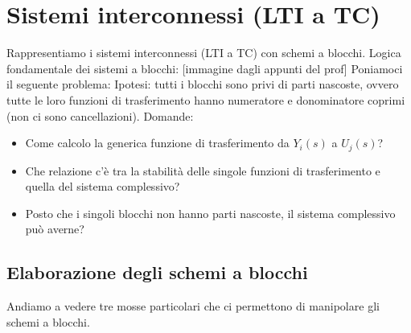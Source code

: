 \section{Sistemi interconnessi (LTI a TC)}
Rappresentiamo i sistemi interconnessi (LTI a TC) con schemi a blocchi.\newline
\newline
Logica fondamentale dei sistemi a blocchi:
[immagine dagli appunti del prof]\newline
\newline
Poniamoci il seguente problema:\newline
Ipotesi: tutti i blocchi sono privi di parti nascoste, ovvero tutte le loro funzioni di trasferimento hanno numeratore e donominatore coprimi (non ci sono cancellazioni).\newline
Domande:
\begin{itemize}
    \item Come calcolo la generica funzione di trasferimento da $Y_i(s)$ a $U_j(s)$?
    \item Che relazione c'è tra la stabilità delle singole funzioni di trasferimento e quella del sistema complessivo?
    \item Posto che i singoli blocchi non hanno parti nascoste, il sistema complessivo può averne?
\end{itemize}
\subsection{Elaborazione degli schemi a blocchi}
Andiamo a vedere tre mosse particolari che ci permettono di manipolare gli schemi a blocchi.
